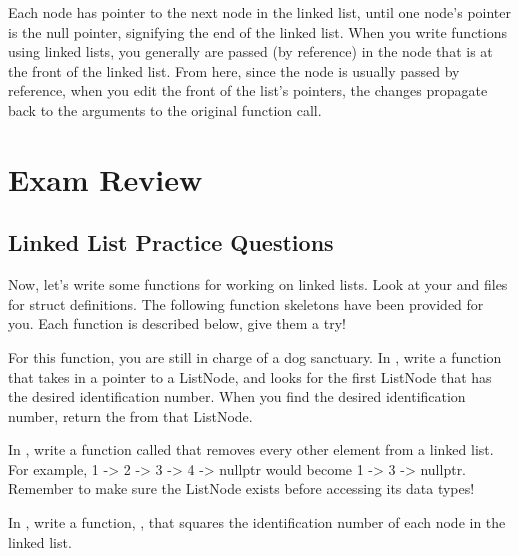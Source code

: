 \documentclass{tufte-handout}
\begin{document}
Each node has pointer to the next node in the linked list, until one node's pointer is the null pointer, signifying the end of the linked list.
When you write functions using linked lists, you generally are passed (by reference) in the node that is at the front of the linked list.
From here, since the node is usually passed by reference, when you edit the front of the list's pointers, the changes propagate back to the arguments to the original function call.

\section{Exam Review}
\subsection{Linked List Practice Questions}

Now, let's write some functions for working on linked lists.
Look at your  and  files for struct definitions.
The following function skeletons have been provided for you. Each function is described below, give them a try!

\medskip \noindent
\textbf{}
\medskip

\noindent For this function, you are still in charge of a dog sanctuary. 
In , write a function  that takes in a pointer to a ListNode, and looks for the first ListNode that has the desired identification number.
When you find the desired identification number, return the  from that ListNode.

\medskip \noindent
\textbf{}
\medskip

\noindent In , write a function called  that removes every other element from a linked list.  
For example, 1 -> 2 -> 3 -> 4 -> nullptr would become 1 -> 3 -> nullptr.  
Remember to make sure the ListNode exists before accessing its data types!

\medskip \noindent
\textbf{}
\medskip

\noindent In , write a function, , that squares the identification number of each node in the linked list.
\end{document}
